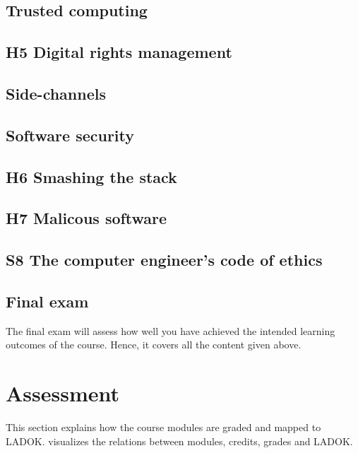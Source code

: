 \subsection{Trusted computing}


\subsection{H5 Digital rights management}


\subsection{Side-channels}


\subsection{Software security}


\subsection{H6 Smashing the stack}


\subsection{H7 Malicous software}


\subsection{S8 The computer engineer's code of ethics}


\subsection{Final exam}

The final exam will assess how well you have achieved the intended learning 
outcomes of the course.
Hence, it covers all the content given above.


\section{Assessment}%
\label{Assessment}

This section explains how the course modules are graded and mapped to LADOK\@.
 visualizes the relations between modules, credits, grades and 
LADOK\@.

